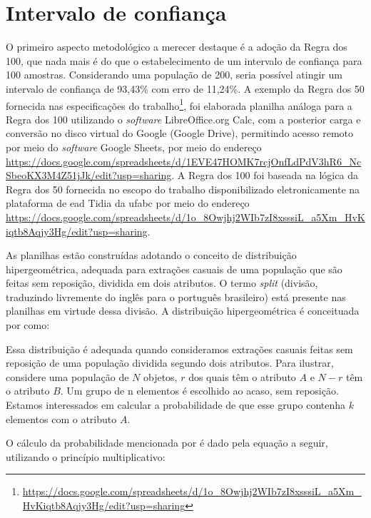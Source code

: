 	\section{Intervalo de confiança}
	
	O primeiro aspecto metodológico a merecer destaque é a adoção da Regra dos 100, que nada mais é do que o estabelecimento de um intervalo de confiança para 100 amostras. Considerando uma população de 200, seria possível atingir um intervalo de confiança de 93,43\% com erro de 11,24\%. A exemplo da Regra dos 50 fornecida nas especificações do trabalho\footnote{\url{https://docs.google.com/spreadsheets/d/1o_8Owjhj2WIb7zI8xsssiL_a5Xm_HvKiqtb8Aqjy3Hg/edit?usp=sharing}}, foi elaborada planilha análoga para a Regra dos 100 utilizando o \textit{software} LibreOffice.org Calc, com a posterior carga e conversão no disco virtual do Google (Google Drive), permitindo acesso remoto por meio do \textit{software} Google Sheets, por meio do endereço \url{https://docs.google.com/spreadsheets/d/1EVE47HOMK7rcjOnfLdPdV3hR6_NcSbeoKX3M4Z51jJk/edit?usp=sharing}. A Regra dos 100 foi baseada na lógica da Regra dos 50 fornecida no escopo do trabalho disponibilizado eletronicamente na plataforma de \gls{ead} Tidia da \gls{ufabc} por meio do endereço \url{https://docs.google.com/spreadsheets/d/1o_8Owjhj2WIb7zI8xsssiL_a5Xm_HvKiqtb8Aqjy3Hg/edit?usp=sharing}.
	
	As planilhas estão construídas adotando o conceito de distribuição hipergeométrica, adequada para extrações casuais de uma população que são feitas sem reposição, dividida em dois atributos. O termo \textit{split} (divisão, traduzindo livremente do inglês para o português brasileiro) está presente nas planilhas em virtude dessa divisão. A distribuição hipergeométrica é conceituada por  como:
	
	\begin{citacao}
	    Essa distribuição é adequada quando consideramos extrações casuais feitas sem reposição de uma população dividida segundo dois atributos. Para ilustrar, considere uma população de $N$ objetos, $r$ dos quais têm o atributo $A$ e $N - r$ têm o atributo $B$. Um grupo de n elementos é escolhido ao acaso, sem reposição. Estamos interessados em calcular a probabilidade de que esse grupo contenha $k$ elementos com o atributo $A$.
	\end{citacao}
	
	O cálculo da probabilidade mencionada por  é dado pela equação a seguir, utilizando o princípio multiplicativo:
	
